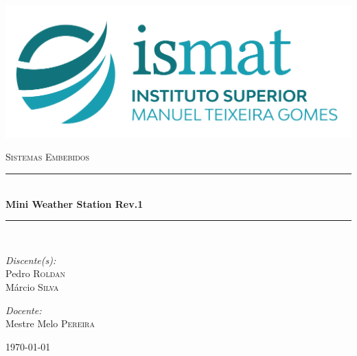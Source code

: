 \begin{titlepage}
	\begin{center}
	
		\includegraphics[scale=1.5]{./img/logotipo.png}
		
		
		
		\textsc{\Large Sistemas Embebidos}\\[1.5cm]
		
		\newcommand{\HRule}{\rule{\linewidth}{0.5mm}}
		\HRule \\[0.4cm]
		{ \huge \bfseries Mini Weather Station Rev.1 \\[0.4cm] }
		
		\HRule \\[1.5cm]
		
		\noindent
		
		\begin{minipage}[t]{0.4\textwidth}
			\begin{flushleft} \large
				\emph{Discente(s):}\\
				Pedro \textsc{Roldan}\\
				Márcio \textsc{Silva}
			\end{flushleft}
		\end{minipage}%
		\begin{minipage}[t]{0.4\textwidth}
			\begin{flushright} \large
				\emph{Docente:} \\
				Mestre Melo \textsc{Pereira}
			\end{flushright}
		\end{minipage}
		
		\vfill
		
		{\large \today}
	
	\end{center}
\end{titlepage}
